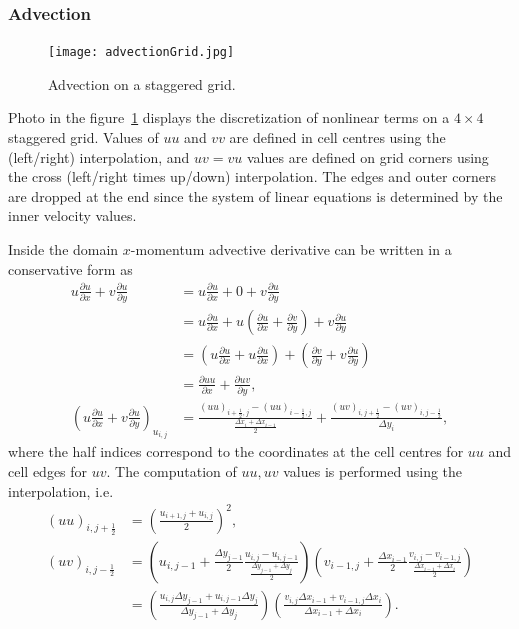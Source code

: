 \documentclass{article}
\begin{document}
\subsubsection{Advection}

\begin{figure}
\centering
{\texttt{[image: advectionGrid.jpg]} }
\caption{\small Advection on a staggered grid.}\label{fig:advectionGrid}
\end{figure}
Photo in the figure~\ref{fig:advectionGrid} displays the discretization of nonlinear terms on a $4\times 4$ staggered grid. Values of $uu$ and $vv$ are defined in cell centres using the (left/right) interpolation, and $uv=vu$ values are defined on grid corners using the cross (left/right times up/down) interpolation. The edges and outer corners are dropped at the end since the system of linear equations is determined by the inner velocity values. 

Inside the domain $x$-momentum advective derivative can be written in a conservative form as
\begin{align*}
	u\frac{\partial u}{\partial x}+v \frac{\partial u}{\partial y}&=u\frac{\partial u}{\partial x}+0+v \frac{\partial u}{\partial y}\\
	&= u\frac{\partial u}{\partial x}+ u\left(\frac{\partial u}{\partial x} +\frac{\partial v}{\partial y}\right ) +v \frac{\partial u}{\partial y}\\
	&=\left(u\frac{\partial u}{\partial x}+ u\frac{\partial u}{\partial x}\right ) +\left(\frac{\partial v}{\partial y} +v \frac{\partial u}{\partial y}\right )\\
	&=\frac{\partial uu}{\partial x}+ \frac{\partial uv}{\partial y},\\
	\left (u\frac{\partial u}{\partial x}+v \frac{\partial u}{\partial y}\right)_{u_{i,j}}&=\frac{(uu)_{i+\frac{1}{2},j}-(uu)_{i- \frac{1}{2},j}}{\frac{\Delta x_i+\Delta x_{i-1}}{2}}+\frac{(uv)_{i,j+\frac{1}{2}}-(uv)_{i,j-\frac{1}{2}}}{\Delta y_i},
\end{align*}
where the half indices correspond to the coordinates at the cell centres for $uu$ and cell edges for $uv$. The computation of $uu,uv$ values is performed using the interpolation, i.e.
\begin{align*}
  (uu)_{i,j+\frac{1}{2}}&=\left(\frac{u_{i+1,j}+u_{i,j}}{2}\right)^2,\\
  (uv)_{i,j-\frac{1}{2}}&=\left(u_{i,j-1} + \frac{\Delta y_{j-1}}{2}\frac{u_{i,j}-u_{i,j-1}}{\frac{\Delta y_{j-1} +\Delta y_j}{2}} \right) \left( v_{i-1,j} + \frac{\Delta x_{i-1}}{2}\frac{v_{i,j}-v_{i-1,j}}{\frac{\Delta x_{i-1} +\Delta x_i}{2}}\right)\\
  &=\left(\frac{u_{i,j}\Delta y_{j-1} +u_{i,j-1}\Delta y_j}{\Delta y_{j-1}+\Delta y_{j}}\right )\left ( \frac{v_{i,j}\Delta x_{i-1} +v_{i-1,j}\Delta x_i}{\Delta x_{i-1}+\Delta x_{i}}\right).
\end{align*}
\end{document}
